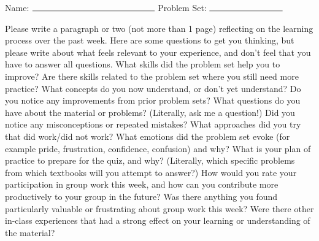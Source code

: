 \documentclass[11pt]{article}
\begin{document}

\hfill Name: $\rule{5cm}{.15mm}$\newline
{}\hfill Problem Set: $\rule{3cm}{.15mm}$




\vspace{1cm}
\Large{
Please write a paragraph or two (not more than 1 page) reflecting on the learning process over the past week. Here are some questions to get you thinking, but please write about what feels relevant to your experience, and don't feel that you have to answer all questions. What skills did the problem set help you to improve? Are there skills related to the problem set where you still need more practice? What concepts do you now understand, or don't yet understand? Do you notice any improvements from prior problem sets? What questions do you have about the material or problems? (Literally, ask me a question!) Did you notice any misconceptions or repeated mistakes? What approaches did you try that did work/did not work? What emotions did the problem set evoke (for example pride, frustration, confidence, confusion) and why? What is your plan of practice to prepare for the quiz, and why? (Literally, which specific problems from which textbooks will you attempt to answer?) How would you rate your participation in group work this week, and how can you contribute more productively to your group in the future? Was there anything you found particularly valuable or frustrating about group work this week? Were there other in-class experiences that had a strong effect on your learning or understanding of the material?}
\end{document}
